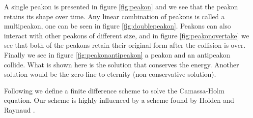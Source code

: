 A single peakon is presented in figure \ref{fig:peakon} and we see that the peakon retains its shape over time. Any linear combination of peakons is called a multipeakon, one can be seen in figure \ref{fig:doublepeakon}. Peakons can also interact with other peakons of different size, and in figure \ref{fig:peakonovertake} we see that both of the peakons retain their original form after the collision is over. Finally we see in figure \ref{fig:peakonantipeakon} a peakon and an antipeakon collide. What is shown here is the solution that conserves the energy. Another solution would be the zero line to eternity (non-conservative solution).

Following we define a finite difference scheme to solve the Camassa-Holm equation. Our scheme is highly influenced by a scheme found by Holden and Raynaud \cite{holden2006convergence}.
